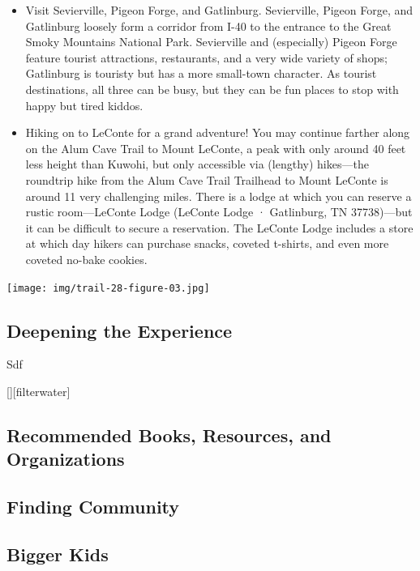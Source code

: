\documentclass[
  letterpaper,
  DIV=11,
  numbers=noendperiod]{scrartcl}
\providecommand{\tightlist}{%
  \setlength{\itemsep}{0pt}\setlength{\parskip}{0pt}}\usepackage{longtable,booktabs,array}
\begin{document}
\begin{itemize}
\tightlist
\item
  Visit Sevierville, Pigeon Forge, and Gatlinburg. Sevierville, Pigeon
  Forge, and Gatlinburg loosely form a corridor from I-40 to the
  entrance to the Great Smoky Mountains National Park. Sevierville and
  (especially) Pigeon Forge feature tourist attractions, restaurants,
  and a very wide variety of shops; Gatlinburg is touristy but has a
  more small-town character. As tourist destinations, all three can be
  busy, but they can be fun places to stop with happy but tired kiddos.
\item
  Hiking on to LeConte for a grand adventure! You may continue farther
  along on the Alum Cave Trail to Mount LeConte, a peak with only around
  40 feet less height than Kuwohi, but only accessible via (lengthy)
  hikes---the roundtrip hike from the Alum Cave Trail Trailhead to Mount
  LeConte is around 11 very challenging miles. There is a lodge at which
  you can reserve a rustic room---LeConte Lodge (LeConte Lodge ·
  Gatlinburg, TN 37738)---but it can be difficult to secure a
  reservation. The LeConte Lodge includes a store at which day hikers
  can purchase snacks, coveted t-shirts, and even more coveted no-bake
  cookies.
\end{itemize}

\texttt{[image: img/trail-28-figure-03.jpg]}

\hypertarget{deepening-the-experience}{%
\subsection{Deepening the Experience}\label{deepening-the-experience}}

Sdf

{[}{]}{[}filterwater{]}

\hypertarget{recommended-books-resources-and-organizations}{%
\subsection{Recommended Books, Resources, and
Organizations}\label{recommended-books-resources-and-organizations}}

\hypertarget{finding-community}{%
\subsection{Finding Community}\label{finding-community}}

\hypertarget{bigger-kids}{%
\subsection{Bigger Kids}\label{bigger-kids}}
\end{document}
